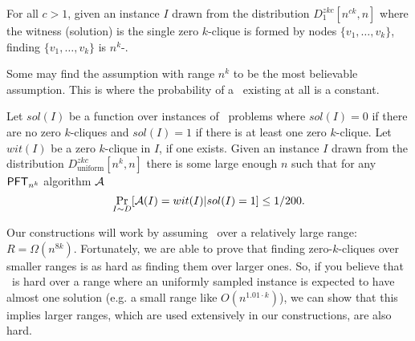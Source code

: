 

\begin{definition}\label{def:strongzkc}
	For all $c>1$, given an instance $I$ drawn from the distribution $D^{zkc}_{1}[n^{ck},n]$ where the witness (solution) is the single zero $k$-clique is formed by nodes $\{v_1,\ldots,v_k\}$, finding $\{v_1, \ldots, v_k\}$ is $n^k$-\ACSH.
\end{definition}


Some may find the assumption with range $n^k$ to be the most believable assumption. This is where the probability of a \zkclique~existing at all is a constant. %
\begin{definition}[\RandomZKC]
	Let $sol(I)$ be a function over instances of \zkclique~problems where $sol(I)=0$ if there are no zero $k$-cliques and $sol(I)=1$ if there is at least one zero $k$-clique. Let $wit(I)$ be a zero $k$-clique in $I$, if one exists.
	Given an instance $I$ drawn from the distribution $D^{zkc}_{\textrm{uniform}}[n^k,n]$ there is some large enough $n$ such that
	for any  $\mathsf{PFT}_{n^k}$ algorithm $\mathcal{A}$
	\[ \Pr_{I \sim D}[\mathcal{A}(I) = wit(I)| sol(I)=1] \le 1/200. \]
\end{definition}

Our constructions will work by assuming \Strongzkc~over a relatively large range: $R = \Omega(n^{8k})$. Fortunately, we are able to prove that finding zero-$k$-cliques over smaller ranges is as hard as finding them over larger ones.
So, if you believe that \zkclique~is hard over a range where an uniformly sampled instance is expected to have almost one solution (e.g. a small range like $O(n^{1.01\cdot k})$), we can show that this implies larger ranges, which are used extensively in our constructions, are also hard.

